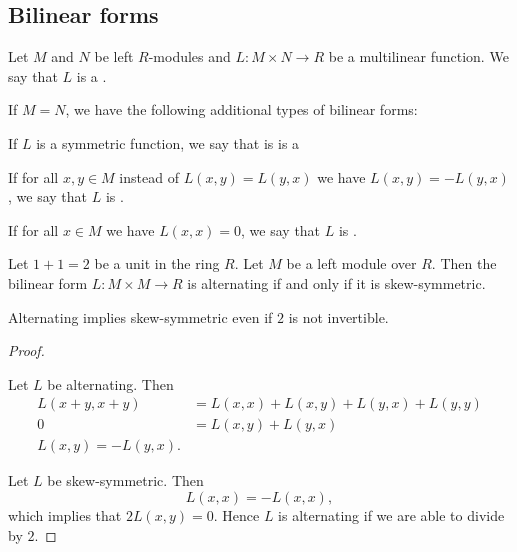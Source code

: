 \subsection{Bilinear forms}\label{subsec:bilinear_forms}

\begin{definition}\label{def:bilinear_form}\cite[249]{Knapp2016BAlg}
  Let \( M \) and \( N \) be left \( R \)-modules and \( L: M \times N \to R \) be a multilinear function. We say that \( L \) is a .

  If \( M = N \), we have the following additional types of bilinear forms:
  \begin{defenum}
     If \( L \) is a symmetric function, we say that is is a 

     If for all \( x, y \in M \) instead of \( L(x, y) = L(y, x) \) we have \( L(x, y) = -L(y, x) \), we say that \( L \) is .

     If for all \( x \in M \) we have \( L(x, x) = 0 \), we say that \( L \) is .
  \end{defenum}
\end{definition}

\begin{proposition}\label{thm:skew_symmetric_iff_alternating}
  Let \( 1 + 1 = 2 \) be a unit in the ring \( R \). Let \( M \) be a left module over \( R \). Then the bilinear form \( L: M \times M \to R \) is alternating if and only if it is skew-symmetric.

  Alternating implies skew-symmetric even if \( 2 \) is not invertible.
\end{proposition}
\begin{proof}
  \begin{description}
    \Implies Let \( L \) be alternating. Then
    \begin{align*}
      L(x + y, x + y) &= L(x, x) + L(x, y) + L(y, x) + L(y, y) \\
      0 &= L(x, y) + L(y, x) \\
      L(x, y) = -L(y, x).
    \end{align*}
  \end{description}

  \ImpliedBy Let \( L \) be skew-symmetric. Then
  \begin{equation*}
    L(x, x) = -L(x, x),
  \end{equation*}
  which implies that \( 2L(x, y) = 0 \). Hence \( L \) is alternating if we are able to divide by \( 2 \).
\end{proof}

